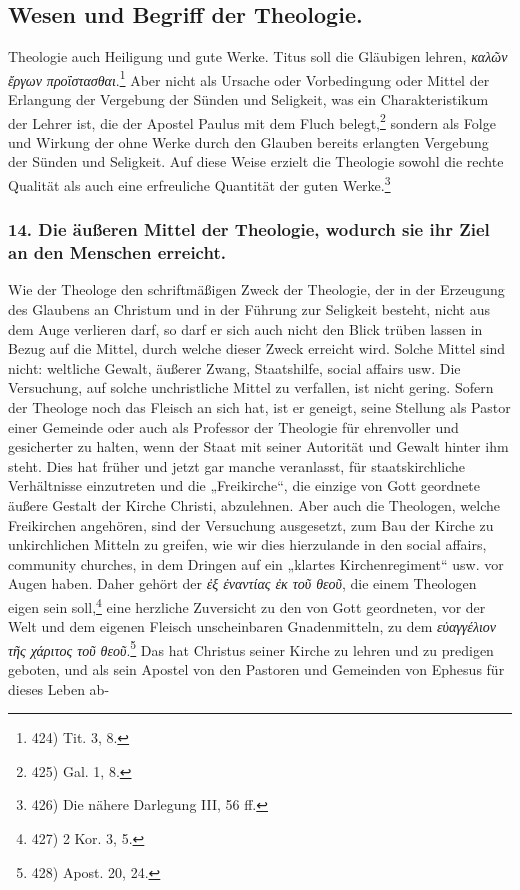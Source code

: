 \subsection*{Wesen und Begriff der Theologie.}

Theologie auch Heiligung und gute Werke. Titus soll die Gläubigen lehren, \textit{\foreignlanguage{greek}{καλῶν ἔργων προΐστασθαι}}.\footnote{424) Tit. 3, 8.} Aber nicht als Ursache oder Vorbedingung oder Mittel der Erlangung der Vergebung der Sünden und Seligkeit, was ein Charakteristikum der Lehrer ist, die der Apostel Paulus mit dem Fluch belegt,\footnote{425) Gal. 1, 8.} sondern als Folge und Wirkung der ohne Werke durch den Glauben bereits erlangten Vergebung der Sünden und Seligkeit. Auf diese Weise erzielt die Theologie sowohl die rechte Qualität als auch eine erfreuliche Quantität der guten Werke.\footnote{426) Die nähere Darlegung III, 56 ff.}

\subsubsection*{14. Die äußeren Mittel der Theologie, wodurch sie ihr Ziel an den Menschen erreicht.}

Wie der Theologe den schriftmäßigen Zweck der Theologie, der in der Erzeugung des Glaubens an Christum und in der Führung zur Seligkeit besteht, nicht aus dem Auge verlieren darf, so darf er sich auch nicht den Blick trüben lassen in Bezug auf die Mittel, durch welche dieser Zweck erreicht wird. Solche Mittel sind nicht: weltliche Gewalt, äußerer Zwang, Staatshilfe, social affairs usw. Die Versuchung, auf solche unchristliche Mittel zu verfallen, ist nicht gering. Sofern der Theologe noch das Fleisch an sich hat, ist er geneigt, seine Stellung als Pastor einer Gemeinde oder auch als Professor der Theologie für ehrenvoller und gesicherter zu halten, wenn der Staat mit seiner Autorität und Gewalt hinter ihm steht. Dies hat früher und jetzt gar manche veranlasst, für staatskirchliche Verhältnisse einzutreten und die „Freikirche“, die einzige von Gott geordnete äußere Gestalt der Kirche Christi, abzulehnen. Aber auch die Theologen, welche Freikirchen angehören, sind der Versuchung ausgesetzt, zum Bau der Kirche zu unkirchlichen Mitteln zu greifen, wie wir dies hierzulande in den social affairs, community churches, in dem Dringen auf ein „klartes Kirchenregiment“ usw. vor Augen haben. Daher gehört der \textit{\foreignlanguage{greek}{ἐξ ἐναντίας ἐκ τοῦ θεοῦ}}, die einem Theologen eigen sein soll,\footnote{427) 2 Kor. 3, 5.} eine herzliche Zuversicht zu den von Gott geordneten, vor der Welt und dem eigenen Fleisch unscheinbaren Gnadenmitteln, zu dem \textit{\foreignlanguage{greek}{εὐαγγέλιον τῆς χάριτος τοῦ θεοῦ}}.\footnote{428) Apost. 20, 24.} Das hat Christus seiner Kirche zu lehren und zu predigen geboten, und als sein Apostel von den Pastoren und Gemeinden von Ephesus für dieses Leben ab-